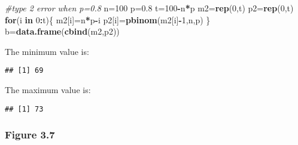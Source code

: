 \documentclass[
]{article}
\newenvironment{Shaded}{\begin{snugshade}}{\end{snugshade}}
\newcommand{\CommentTok}[1]{\textcolor[rgb]{0.56,0.35,0.01}{\textit{#1}}}
\newcommand{\ControlFlowTok}[1]{\textcolor[rgb]{0.13,0.29,0.53}{\textbf{#1}}}
\newcommand{\DecValTok}[1]{\textcolor[rgb]{0.00,0.00,0.81}{#1}}
\newcommand{\FloatTok}[1]{\textcolor[rgb]{0.00,0.00,0.81}{#1}}
\newcommand{\KeywordTok}[1]{\textcolor[rgb]{0.13,0.29,0.53}{\textbf{#1}}}
\newcommand{\NormalTok}[1]{#1}
\newcommand{\OperatorTok}[1]{\textcolor[rgb]{0.81,0.36,0.00}{\textbf{#1}}}
\newcommand{\StringTok}[1]{\textcolor[rgb]{0.31,0.60,0.02}{#1}}
\begin{document}
\begin{Shaded}
\begin{Highlighting}[]
\CommentTok{#type 2 error when p=0.8}
\NormalTok{n=}\DecValTok{100}
\NormalTok{p=}\FloatTok{0.8}
\NormalTok{t=}\DecValTok{100}\OperatorTok{-}\NormalTok{n}\OperatorTok{*}\NormalTok{p}
\NormalTok{m2=}\KeywordTok{rep}\NormalTok{(}\DecValTok{0}\NormalTok{,t)}
\NormalTok{p2=}\KeywordTok{rep}\NormalTok{(}\DecValTok{0}\NormalTok{,t)}
\ControlFlowTok{for}\NormalTok{(i }\ControlFlowTok{in} \DecValTok{0}\OperatorTok{:}\NormalTok{t)\{}
\NormalTok{  m2[i]=n}\OperatorTok{*}\NormalTok{p}\OperatorTok{-}\NormalTok{i}
\NormalTok{  p2[i]=}\KeywordTok{pbinom}\NormalTok{(m2[i]}\OperatorTok{-}\DecValTok{1}\NormalTok{,n,p)}
\NormalTok{\}}
\NormalTok{b=}\KeywordTok{data.frame}\NormalTok{(}\KeywordTok{cbind}\NormalTok{(m2,p2))}
\end{Highlighting}
\end{Shaded}

\begin{Shaded}
\end{Shaded}

The minimum value is:

\begin{verbatim}
## [1] 69
\end{verbatim}

The maximum value is:

\begin{verbatim}
## [1] 73
\end{verbatim}

\hypertarget{figure-3.7}{%
\subsubsection{Figure 3.7}\label{figure-3.7}}
\end{document}
